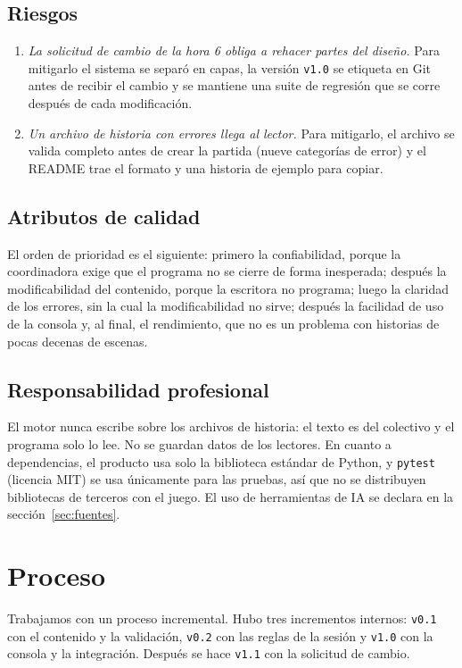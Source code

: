 \documentclass[11pt,letterpaper]{article}
\newcommand{\cod}[1]{\texttt{#1}}
\begin{document}
\subsection{Riesgos}
\begin{enumerate}[label=R\arabic*.]
  \item \textit{La solicitud de cambio de la hora 6 obliga a rehacer partes del diseño.} Para mitigarlo el sistema se separó en capas, la versión \cod{v1.0} se etiqueta en Git antes de recibir el cambio y se mantiene una suite de regresión que se corre después de cada modificación.
  \item \textit{Un archivo de historia con errores llega al lector.} Para mitigarlo, el archivo se valida completo antes de crear la partida (nueve categorías de error) y el README trae el formato y una historia de ejemplo para copiar.
\end{enumerate}

\subsection{Atributos de calidad}
El orden de prioridad es el siguiente: primero la confiabilidad, porque la coordinadora exige que el programa no se cierre de forma inesperada; después la modificabilidad del contenido, porque la escritora no programa; luego la claridad de los errores, sin la cual la modificabilidad no sirve; después la facilidad de uso de la consola y, al final, el rendimiento, que no es un problema con historias de pocas decenas de escenas.

\subsection{Responsabilidad profesional}
El motor nunca escribe sobre los archivos de historia: el texto es del colectivo y el programa solo lo lee. No se guardan datos de los lectores. En cuanto a dependencias, el producto usa solo la biblioteca estándar de Python, y \cod{pytest} (licencia MIT) se usa únicamente para las pruebas, así que no se distribuyen bibliotecas de terceros con el juego. El uso de herramientas de IA se declara en la sección~\ref{sec:fuentes}.

\section{Proceso}
Trabajamos con un proceso incremental. Hubo tres incrementos internos: \cod{v0.1} con el contenido y la validación, \cod{v0.2} con las reglas de la sesión y \cod{v1.0} con la consola y la integración. Después se hace \cod{v1.1} con la solicitud de cambio.
\end{document}
